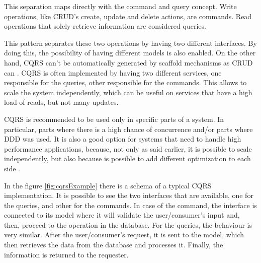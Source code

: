 This separation maps directly with the command and query concept. Write operations, like \gls{CRUD}'s create, update and delete actions, are commands. Read operations that solely retrieve information are considered queries.
\par
This pattern separates these two operations by having two different interfaces. By doing this, the possibility of having different models is also enabled. On the other hand, \gls{CQRS} can't be automatically generated by scaffold mechanisms as \gls{CRUD} can \parencite{microsoftCqrs}. \gls{CQRS} is often implemented by having two different services, one responsible for the queries, other responsible for the commands. This allows to scale the system independently, which can be useful on services that have a high load of reads, but not many updates.

\par 

\gls{CQRS} is recommended to be used only in specific parts of a system. In particular, parts where there is a high chance of concurrence and/or parts where \gls{DDD} was used. It is also a good option for systems that need to handle high performance applications, because, not only as said earlier, it is possible to scale independently, but also because is possible to add different optimization to each side \parencite{cqrs}.
\par

In the figure \ref{fig:cqrsExample}  there is a schema of a typical \gls{CQRS} implementation. It is possible to see the two interfaces that are available, one for the queries, and other for the commands. In case of the command, the interface is connected to its model where it will validate the user/consumer's input and, then, proceed to the operation in the database. For the queries, the behaviour is very similar. After the user/consumer's request, it is sent to the model, which then retrieves the data from the database and processes it. Finally, the information is returned to the requester.

\par

